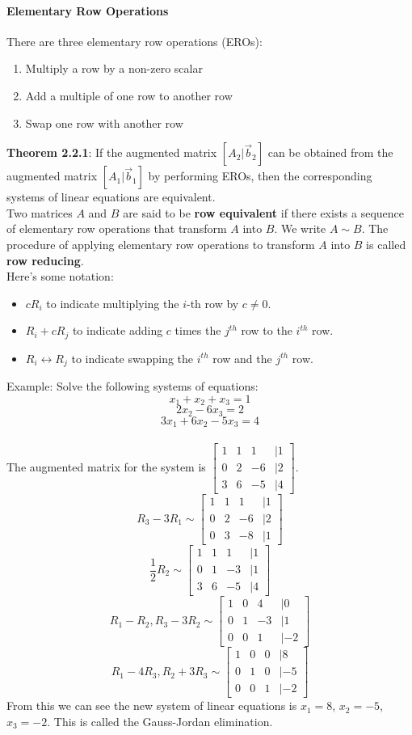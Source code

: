 \documentclass[10pt,letter]{article}
\begin{document}
\paragraph{Elementary Row Operations} There are three elementary row operations (EROs): 
\begin{enumerate}
    \item Multiply a row by a non-zero scalar 
    \item Add a multiple of one row to another row 
    \item Swap one row with another row 
\end{enumerate}
\textbf{Theorem 2.2.1}: If the augmented matrix $[A_2|\vec{b}_2]$ can be obtained from the augmented matrix $[A_1|\vec{b}_1]$ by performing EROs, then the corresponding systems of linear equations are equivalent. \\ 
Two matrices $A$ and $B$ are said to be \textbf{row equivalent} if there exists a sequence of elementary row operations that transform $A$ into $B$. We write $A\sim B$. The procedure of applying elementary row operations to transform $A$ into $B$ is called \textbf{row reducing}. \\ 
Here's some notation: \begin{itemize}
    \item $cR_i$ to indicate multiplying the $i$-th row by $c\neq0$. 
    \item $R_i+cR_j$ to indicate adding $c$ times the $j^{th}$ row to the $i^{th}$ row. 
    \item $R_i\leftrightarrow R_j$ to indicate swapping the $i^{th}$ row and the $j^{th}$ row. 
\end{itemize}
Example: Solve the following systems of equations: $$x_1+x_2+x_3=1$$ $$2x_2-6x_3=2$$
$$3x_1+6x_2-5x_3=4$$ \\ 
The augmented matrix for the system is $\begin{bmatrix}1&1&1&|1\\0&2&-6&|2\\3&6&-5&|4\end{bmatrix}$. $$R_3-3R_1\sim \begin{bmatrix}1&1&1&|1\\0&2&-6&|2\\0&3&-8&|1\end{bmatrix}$$ $$\frac{1}{2}R_2\sim\begin{bmatrix}1&1&1&|1\\0&1&-3&|1\\3&6&-5&|4\end{bmatrix}$$ $$R_1-R_2, R_3-3R_2 \sim\begin{bmatrix}1&0&4&|0\\0&1&-3&|1\\0&0&1&|-2\end{bmatrix}$$ $$R_1-4R_3, R_2+3R_3\sim \begin{bmatrix}1&0&0&|8\\0&1&0&|-5\\0&0&1&|-2\end{bmatrix}$$
From this we can see the new system of linear equations is $x_1=8$, $x_2=-5$, $x_3=-2$. This is called the Gauss-Jordan elimination. 
\end{document}
